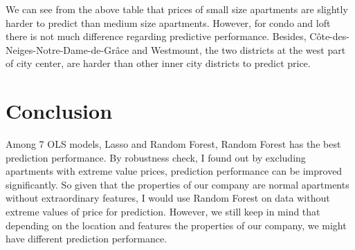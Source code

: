 \documentclass[
]{article}
\begin{document}
We can see from the above table that prices of small size apartments are
slightly harder to predict than medium size apartments. However, for
condo and loft there is not much difference regarding predictive
performance. Besides, Côte-des-Neiges-Notre-Dame-de-Grâce and Westmount,
the two districts at the west part of city center, are harder than other
inner city districts to predict price.

\hypertarget{conclusion}{%
\section{Conclusion}\label{conclusion}}

Among 7 OLS models, Lasso and Random Forest, Random Forest has the best
prediction performance. By robustness check, I found out by excluding
apartments with extreme value prices, prediction performance can be
improved significantly. So given that the properties of our company are
normal apartments without extraordinary features, I would use Random
Forest on data without extreme values of price for prediction. However,
we still keep in mind that depending on the location and features the
properties of our company, we might have different prediction
performance.
\end{document}
